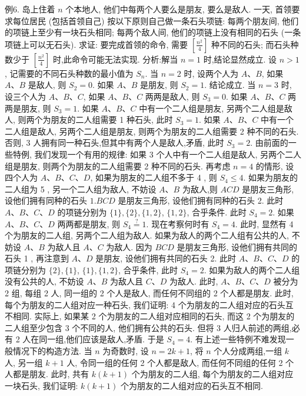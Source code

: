 例6. 岛上住着 $n$ 个本地人, 他们中每两个人要么是朋友, 要么是敌人.
一天, 首领要求每位居民 (包括首领自己) 按以下原则自己做一条石头项链: 每两个朋友间, 他们的项链上至少有一块石头相同; 每两个敌人间, 他们的项链上没有相同的石头 (一条项链上可以无石头). 求证: 要完成首领的命令, 需要 $\left[\frac{n^2}{4}\right]$ 种不同的石头; 而石头种数少于 $\left[\frac{n^2}{4}\right]$ 时,此命令可能无法实现.
分析:解当 $n=1$ 时,结论显然成立.
设 $n>1$, 记需要的不同石头种数的最小值为 $S_n$. 当 $n=2$ 时, 设两个人为 $A 、 B$, 如果 $A 、 B$ 是敌人, 则 $S_2=0$. 如果 $A 、 B$ 是朋友, 则 $S_2=1$. 结论成立.
当 $n=3$ 时, 设三个人为 $A 、 B 、 C$, 如果 $A 、 B 、 C$ 两两是敌人, 则 $S_3=0$. 如果 $A 、 B 、 C$ 两两是朋友, 则 $S_3=1$. 如果 $A 、 B 、 C$ 中有一个二人组是朋友, 另两个二人组是敌人, 则两个为朋友的二人组需要 1 种石头, 此时 $S_3=1$. 如果 $A 、 B 、 C$ 中有一个二人组是敌人, 另两个二人组是朋友, 则两个为朋友的二人组需要 2 种不同的石头.
否则, 3 人拥有同一种石头,但其中有两个人是敌人,矛盾, 此时 $S_3=2$.
由前面的一些特例, 我们发现一个有用的规律: 如果 3 个人中有一个二人组是敌人, 另两个二人组是朋友, 则两个为朋友的二人组需要 2 种不同的石头.
再考虑 $n=4$ 的情形, 设四个人为 $A 、 B 、 C 、 D$, 如果为朋友的二人组不多于 4 , 则 $S_4 \leqslant 4$. 如果为朋友的二人组为 5 , 另一个二人组为敌人, 不妨设 $A 、 B$ 为敌人,则 $A C D$ 是朋友三角形,设他们拥有同种的石头 $1 . B C D$ 是朋友三角形, 设他们拥有同种的石头 2. 此时 $A 、 B 、 C 、 D$ 的项链分别为 $\{1\},\{2\},\{1,2\}$, $\{1,2\}$, 合乎条件.
此时 $S_4=2$. 如果 $A 、 B 、 C 、 D$ 两两都是朋友, 则 $S_4 \stackrel{?}{=} 1$.
现在考察何时有 $S_4=4$. 此时, 显然有 4 个为朋友的二人组, 另两个二人组为敌人.
如果为敌人的两个二人组有公共的人, 不妨设 $A 、 B$ 为敌人且 $A 、 C$ 为敌人.
因为 $B C D$ 是朋友三角形, 设他们拥有共同的石头 1 , 再注意到 $A 、 D$ 是朋友, 设他们拥有共同的石头 2. 此时 $A 、 B 、 C 、 D$ 的项链分别为 $\{2\},\{1\}$, $\{1\},\{1,2\}$, 合乎条件, 此时 $S_4=2$. 如果为敌人的两个二人组没有公共的人, 不妨设 $A 、 B$ 为敌人且 $C 、 D$ 为敌人.
此时, $A 、 B 、 C 、 D$ 被分为 2 组, 每组 2 人,
同一组的 2 个人是敌人, 而任何不同组的 2 个人都是朋友.
此时, 每个为朋友的二人组对应一种石头, 我们证明: 4 个为朋友的二人组对应的石头互不相同.
实际上, 如果某 2 个为朋友的二人组对应相同的石头, 而这 2 个为朋友的二人组至少包含 3 个不同的人, 他们拥有公共的石头.
但将 3 人归人前述的两组,必有 2 人在同一组,他们应该是敌人,矛盾.
于是 $S_4=4$.
有上述一些特例不难发现一般情况下的构造方法.
当 $n$ 为奇数时, 设 $n=2 k+1$, 将 $n$ 个人分成两组,一组 $k$ 人, 另一组 $k+1$ 人, 令同一组的任何 2 个人都是敌人, 而任何不同组的任何 2 个人都是朋友.
此时, 共有 $k(k+1)$ 个为朋友的二人组, 每个为朋友的二人组对应一块石头, 我们证明: $k(k+1)$ 个为朋友的二人组对应的石头互不相同.
